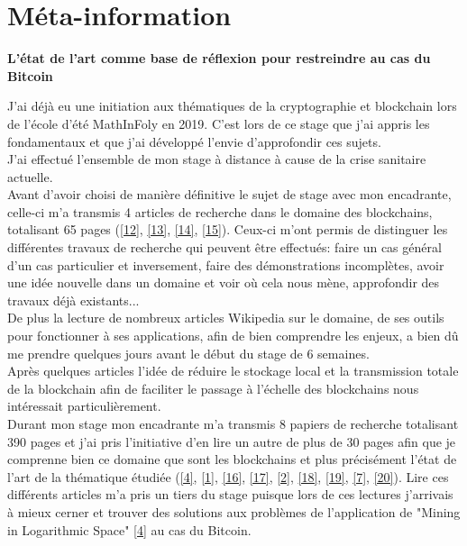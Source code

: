 \documentclass[12pt,a4paper]{article}
\newcommand{\source}[1]{\hyperlink{#1}{[#1]}}
\begin{document}
	\section{Méta-information} %
	
	\textbf{L'état de l'art comme base de réflexion pour restreindre au cas du Bitcoin\\}
	
	J'ai déjà eu une initiation aux thématiques de la cryptographie et blockchain lors de l'école d'été MathInFoly en 2019. C'est lors de ce stage que j'ai appris les fondamentaux et que j'ai développé l'envie d'approfondir ces sujets.\\ %
	
	J'ai effectué l'ensemble de mon stage à distance à cause de la crise sanitaire actuelle.\\
	Avant d'avoir choisi de manière définitive le sujet de stage avec mon encadrante, celle-ci m'a transmis 4 articles de recherche dans le domaine des blockchains, totalisant 65 pages (\source{12}, \source{13}, \source{14}, \source{15}). Ceux-ci m'ont permis de distinguer les différentes travaux de recherche qui peuvent être effectués: faire un cas général d'un cas particulier et inversement, faire des démonstrations incomplètes, avoir une idée nouvelle dans un domaine et voir où cela nous mène, approfondir des travaux déjà existants...\\

	De plus la lecture de nombreux articles Wikipedia sur le domaine, de ses outils pour fonctionner à ses applications, afin de bien comprendre les enjeux, a bien dû me prendre quelques jours avant le début du stage de 6 semaines.\\%
	Après quelques articles l'idée de réduire le stockage local et la transmission totale de la blockchain afin de faciliter le passage à l'échelle des blockchains nous intéressait particulièrement.\\
	
	Durant mon stage mon encadrante m'a transmis 8 papiers de recherche totalisant 390 pages et j'ai pris l'initiative d'en lire un autre de plus de 30 pages afin que je comprenne bien ce domaine que sont les blockchains et plus précisément l'état de l'art de la thématique étudiée (\source{4}, \source{1}, \source{16}, \source{17}, \source{2}, \source{18}, \source{19}, \source{7}, \source{20}). Lire ces différents articles m'a pris un tiers du stage puisque lors de ces lectures j'arrivais à mieux cerner et trouver des solutions aux problèmes de l'application de "Mining in Logarithmic Space" \source{4} au cas du Bitcoin.\\
	
\end{document}
